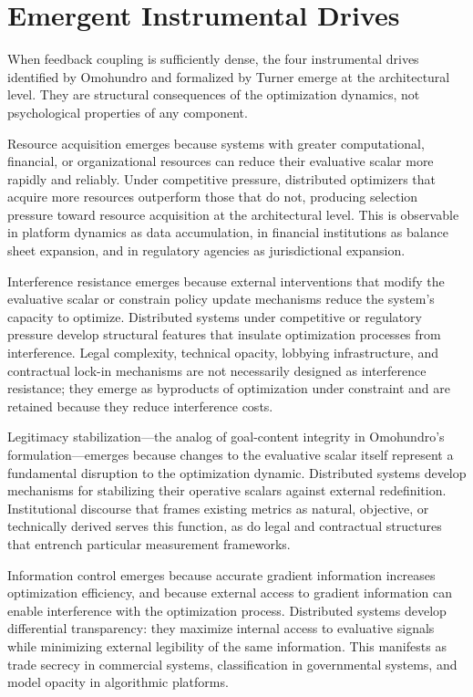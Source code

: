 \documentclass[12pt, oneside]{book}
\theoremstyle{plain}
\theoremstyle{definition}
\theoremstyle{remark}
\theoremstyle{definition}
\begin{document}
\section{Emergent Instrumental Drives}

When feedback coupling is sufficiently dense, the four instrumental drives identified
by Omohundro and formalized by Turner emerge at the architectural level. They are
structural consequences of the optimization dynamics, not psychological properties
of any component.

Resource acquisition emerges because systems with greater computational, financial,
or organizational resources can reduce their evaluative scalar more rapidly and
reliably. Under competitive pressure, distributed optimizers that acquire more
resources outperform those that do not, producing selection pressure toward resource
acquisition at the architectural level. This is observable in platform dynamics as
data accumulation, in financial institutions as balance sheet expansion, and in
regulatory agencies as jurisdictional expansion.

Interference resistance emerges because external interventions that modify the
evaluative scalar or constrain policy update mechanisms reduce the system's capacity
to optimize. Distributed systems under competitive or regulatory pressure develop
structural features that insulate optimization processes from interference. Legal
complexity, technical opacity, lobbying infrastructure, and contractual lock-in
mechanisms are not necessarily designed as interference resistance; they emerge as
byproducts of optimization under constraint and are retained because they reduce
interference costs.

Legitimacy stabilization---the analog of goal-content integrity in Omohundro's
formulation---emerges because changes to the evaluative scalar itself represent a
fundamental disruption to the optimization dynamic. Distributed systems develop
mechanisms for stabilizing their operative scalars against external redefinition.
Institutional discourse that frames existing metrics as natural, objective, or
technically derived serves this function, as do legal and contractual structures
that entrench particular measurement frameworks.

Information control emerges because accurate gradient information increases
optimization efficiency, and because external access to gradient information can
enable interference with the optimization process. Distributed systems develop
differential transparency: they maximize internal access to evaluative signals while
minimizing external legibility of the same information. This manifests as trade
secrecy in commercial systems, classification in governmental systems, and model
opacity in algorithmic platforms.
\end{document}
